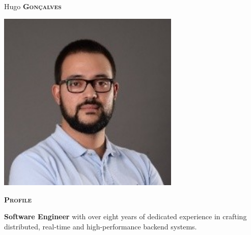 \documentclass[11pt, a4paper]{article}
\newcommand{\headleft}[1]{\vspace*{3ex}\textsc{\textbf{#1}}\par%
\vspace*{-1.5ex}\hrulefill\par\vspace*{0.7ex}}
\begin{document}
    \setlength{\topskip}{0pt}
    \setlength{\parindent}{0pt}
    \setlength{\parskip}{0pt}
    \setlength{\fboxsep}{0pt}
    \pagestyle{empty}
    \raggedbottom

    \begin{minipage}[t]{0.33\textwidth} %
        \colorbox{cvblue}{\begin{minipage}[t][5mm][t]{\textwidth}
                              \null\hfill\null
        \end{minipage}}

        \vspace{-.2ex} %
        \colorbox{cvblue!90}{\color{white}  %
        \textwidth\relax%
            \begin{minipage}[t][293mm][t]{0.82\textwidth}
                \raggedright
                \vspace*{2.5ex}

                \Large Hugo \textbf{\textsc{Gonçalves}} \normalsize

                \null\hfill\includegraphics[width=0.65\textwidth]{hg}\hfill\null

                \vspace*{0.5ex} %

                \headleft{Profile}
                \textbf{Software Engineer} with over eight years of dedicated experience in crafting distributed, real-time and high-performance backend systems.



\end{minipage}}
\end{minipage}
\end{document}
